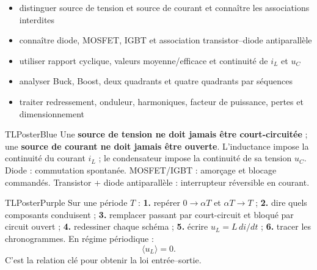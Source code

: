 \documentclass[10pt,a3paper]{article}
\begin{document}
\vspace{2mm}
\begin{minipage}[t]{0.60\linewidth}
\begin{TLPosterSavoirs}
\begin{itemize}
  \item distinguer source de tension et source de courant et connaître les associations interdites
  \item connaître diode, MOSFET, IGBT et association transistor--diode antiparallèle
  \item utiliser rapport cyclique, valeurs moyenne/efficace et continuité de $i_L$ et $u_C$
  \item analyser Buck, Boost, deux quadrants et quatre quadrants par séquences
  \item traiter redressement, onduleur, harmoniques, facteur de puissance, pertes et dimensionnement
\end{itemize}
\end{TLPosterSavoirs}
\end{minipage}\hfill
\begin{minipage}[t]{0.37\linewidth}
\end{minipage}
\vfill
\begin{minipage}[t]{0.49\linewidth}
\begin{TLPosterBloc}{TLPosterBlue}
Une \textbf{source de tension ne doit jamais être court-circuitée} ; une \textbf{source de courant ne doit jamais être ouverte}. L'inductance impose la continuité du courant $i_L$ ; le condensateur impose la continuité de sa tension $u_C$.\\[1mm]
Diode : commutation spontanée. MOSFET/IGBT : amorçage et blocage commandés. Transistor + diode antiparallèle : interrupteur réversible en courant.
\end{TLPosterBloc}
\begin{TLPosterBloc}{TLPosterPurple}
Sur une période $T$ : \textbf{1.} repérer $0\!\to\!\alpha T$ et $\alpha T\!\to\!T$ ; \textbf{2.} dire quels composants conduisent ; \textbf{3.} remplacer passant par court-circuit et bloqué par circuit ouvert ; \textbf{4.} redessiner chaque schéma ; \textbf{5.} écrire $u_L=L\,di/dt$ ; \textbf{6.} tracer les chronogrammes. En régime périodique :
\[
\boxed{\langle u_L\rangle=0}.
\]
C'est la relation clé pour obtenir la loi entrée--sortie.
\end{TLPosterBloc}
\end{minipage}\hfill
\end{document}
